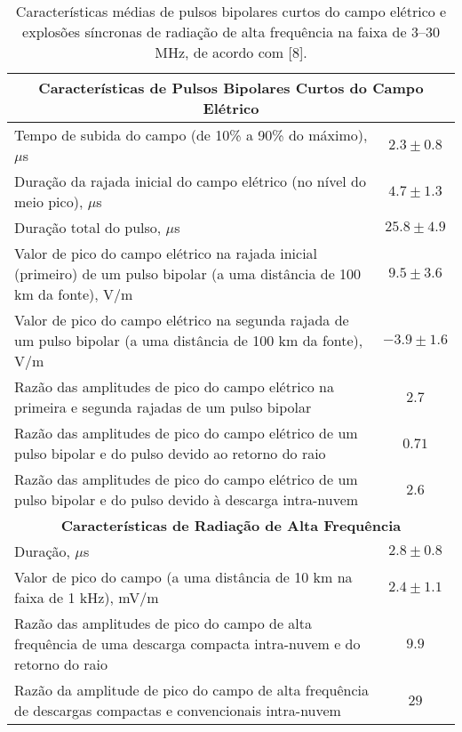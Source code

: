 \documentclass[a4paper, 12pt, onecolumn,singlespacing]{article}
\begin{document}
	\begin{table}[htbp]
		\centering
		\caption{Características médias de pulsos bipolares curtos do campo elétrico e explosões síncronas de radiação de alta frequência na faixa de 3--30 MHz, de acordo com [8].}
		\begin{tabularx}{\textwidth}{@{}p{12cm}c@{}}
			\toprule
			\multicolumn{2}{c}{\textbf{Características de Pulsos Bipolares Curtos do Campo Elétrico}} \\
			\midrule
			Tempo de subida do campo (de 10\% a 90\% do máximo), $\mu$s & $2.3 \pm 0.8$ \\
			Duração da rajada inicial do campo elétrico (no nível do meio pico), $\mu$s & $4.7 \pm 1.3$ \\
			Duração total do pulso, $\mu$s & $25.8 \pm 4.9$ \\
			Valor de pico do campo elétrico na rajada inicial (primeiro) de um pulso bipolar (a uma distância de 100 km da fonte), V/m & $9.5 \pm 3.6$ \\
			Valor de pico do campo elétrico na segunda rajada de um pulso bipolar (a uma distância de 100 km da fonte), V/m & $-3.9 \pm 1.6$ \\
			Razão das amplitudes de pico do campo elétrico na primeira e segunda rajadas de um pulso bipolar & $2.7$ \\
			Razão das amplitudes de pico do campo elétrico de um pulso bipolar e do pulso devido ao retorno do raio & $0.71$ \\
			Razão das amplitudes de pico do campo elétrico de um pulso bipolar e do pulso devido à descarga intra-nuvem & $2.6$ \\
			\midrule
			\multicolumn{2}{c}{\textbf{Características de Radiação de Alta Frequência}} \\
			\midrule
			Duração, $\mu$s & $2.8 \pm 0.8$ \\
			Valor de pico do campo (a uma distância de 10 km na faixa de 1 kHz), mV/m & $2.4 \pm 1.1$ \\
			Razão das amplitudes de pico do campo de alta frequência de uma descarga compacta intra-nuvem e do retorno do raio & $9.9$ \\
			Razão da amplitude de pico do campo de alta frequência de descargas compactas e convencionais intra-nuvem & $29$ \\
			\bottomrule
		\end{tabularx}
	\end{table}
\end{document}
